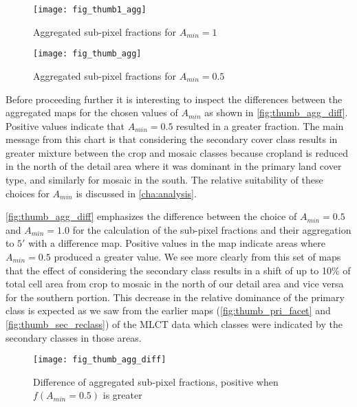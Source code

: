 \begin{figure}[ht] 
\centering
  

\texttt{[image: fig\_thumb1\_agg]}
 
\caption{Aggregated sub-pixel fractions for $A_{min}=1$}
\label{fig:thumb1_agg}
\end{figure} 

\begin{figure}[ht] 
\centering
  

\texttt{[image: fig\_thumb\_agg]}
 
\caption{Aggregated sub-pixel fractions for $A_{min}=0.5$}
\label{fig:thumb_agg}
\end{figure} 



Before proceeding further it is interesting to inspect the differences
between the aggregated maps for the chosen values of $A_{min}$ as
shown in \autoref{fig:thumb_agg_diff}.  Positive values indicate that
$A_{min} = 0.5$ resulted in a greater fraction.  The main message from
this chart is that considering the secondary cover class results in
greater mixture between the crop and mosaic classes because cropland
is reduced in the north of the detail area where it was dominant in
the primary land cover type, and similarly for mosaic in the south.
The relative suitability of these choices for $A_{min}$ is discussed
in \autoref{cha:analysis}.



\autoref{fig:thumb_agg_diff} emphasizes the difference between the
choice of $A_{min}=0.5$ and $A_{min}=1.0$ for the calculation of the
sub-pixel fractions and their aggregation to $5'$ with a difference
map.  Positive values in the map indicate areas where $A_{min}=0.5$
produced a greater value.  We see more clearly from this set of maps
that the effect of considering the secondary class results in a shift
of up to 10\% of total cell area from crop to mosaic in the north of
our detail area and vice versa for the southern portion.  This
decrease in the relative dominance of the primary class is expected as
we saw from the earlier maps (\autoref{fig:thumb_pri_facet} and
\autoref{fig:thumb_sec_reclass}) of the MLCT data which classes were
indicated by the secondary classes in those areas.

\begin{figure}[ht]
\centering
  

\texttt{[image: fig\_thumb\_agg\_diff]}
 
\caption{Difference of aggregated sub-pixel fractions, positive when $f(A_{min} = 0.5)$ is greater}
\label{fig:thumb_agg_diff}
\end{figure} 

